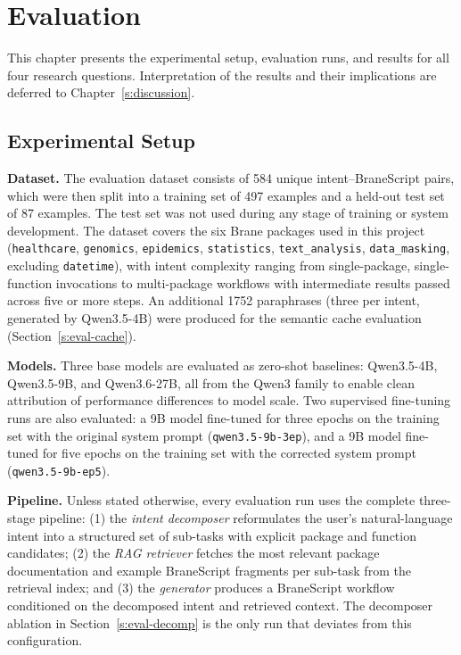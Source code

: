 \chapter{Evaluation}\label{s:evaluation}

This chapter presents the experimental setup, evaluation runs, and results
for all four research questions. Interpretation of the results and their
implications are deferred to Chapter~\ref{s:discussion}.

\section{Experimental Setup}\label{s:eval-setup}

\textbf{Dataset.} The evaluation dataset consists of 584 unique
intent--BraneScript pairs, which were then split into a training set of 497
examples and a held-out test set of 87 examples. The test set was not used
during any stage of training or system development. The dataset covers the
six Brane packages used in this project (\texttt{healthcare},
\texttt{genomics}, \texttt{epidemics}, \texttt{statistics},
\texttt{text\_analysis}, \texttt{data\_masking}, excluding \texttt{datetime}), with
intent complexity ranging from single-package, single-function invocations to
multi-package workflows with intermediate results passed across five or more
steps. An additional 1752 paraphrases (three per intent, generated by
Qwen3.5-4B) were produced for the semantic cache evaluation
(Section~\ref{s:eval-cache}).

\textbf{Models.} Three base models are evaluated as zero-shot baselines:
Qwen3.5-4B, Qwen3.5-9B, and Qwen3.6-27B, all from the Qwen3 family to enable
clean attribution of performance differences to model scale. Two supervised
fine-tuning runs are also evaluated: a 9B model fine-tuned for three epochs on
the training set with the original system prompt (\texttt{qwen3.5-9b-3ep}),
and a 9B model fine-tuned for five epochs on the training set with the
corrected system prompt (\texttt{qwen3.5-9b-ep5}).

\textbf{Pipeline.} Unless stated otherwise, every evaluation run uses the
complete three-stage pipeline: (1) the \emph{intent decomposer} reformulates
the user's natural-language intent into a structured set of sub-tasks with
explicit package and function candidates; (2) the \emph{RAG retriever} fetches
the most relevant package documentation and example BraneScript fragments per
sub-task from the retrieval index; and (3) the \emph{generator} produces
a BraneScript workflow conditioned on the decomposed intent and retrieved
context. The decomposer ablation in Section~\ref{s:eval-decomp} is the only
run that deviates from this configuration.

